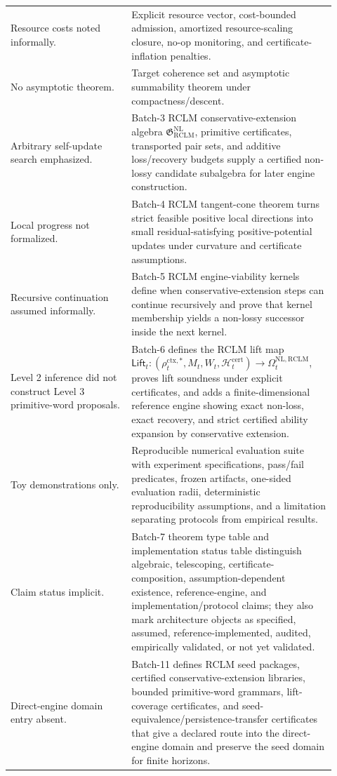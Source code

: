 \documentclass[11pt,a4paper]{article}
\newcommand{\RCLM}{\mathrm{RCLM}}
\newcommand{\ctx}{\mathrm{ctx}}
\newcommand{\cert}{\mathrm{cert}}
\newcommand{\NL}{\mathrm{NL}}
\begin{document}
\begin{longtable}{p{0.34\linewidth}p{0.58\linewidth}}
Resource costs noted informally. & Explicit resource vector, cost-bounded admission, amortized resource-scaling closure, no-op monitoring, and certificate-inflation penalties.\\
No asymptotic theorem. & Target coherence set and asymptotic summability theorem under compactness/descent.\\
Arbitrary self-update search emphasized. & Batch-3 RCLM conservative-extension algebra \(\mathfrak G_{\RCLM}^{\NL}\), primitive certificates, transported pair sets, and additive loss/recovery budgets supply a certified non-lossy candidate subalgebra for later engine construction.\\
Local progress not formalized. & Batch-4 RCLM tangent-cone theorem turns strict feasible positive local directions into small residual-satisfying positive-potential updates under curvature and certificate assumptions.\\
Recursive continuation assumed informally. & Batch-5 RCLM engine-viability kernels define when conservative-extension steps can continue recursively and prove that kernel membership yields a non-lossy successor inside the next kernel.\\
Level 2 inference did not construct Level 3 primitive-word proposals. & Batch-6 defines the RCLM lift map \(\mathsf{Lift}_t:(\rho_t^{\ctx,*},M_t,W_t,\mathcal H_t^{\cert})\to\Omega_t^{\NL,\RCLM}\), proves lift soundness under explicit certificates, and adds a finite-dimensional reference engine showing exact non-loss, exact recovery, and strict certified ability expansion by conservative extension.\\
Toy demonstrations only. & Reproducible numerical evaluation suite with experiment specifications, pass/fail predicates, frozen artifacts, one-sided evaluation radii, deterministic reproducibility assumptions, and a limitation separating protocols from empirical results.\\
Claim status implicit. & Batch-7 theorem type table and implementation status table distinguish algebraic, telescoping, certificate-composition, assumption-dependent existence, reference-engine, and implementation/protocol claims; they also mark architecture objects as specified, assumed, reference-implemented, audited, empirically validated, or not yet validated.\\
Direct-engine domain entry absent. & Batch-11 defines RCLM seed packages, certified conservative-extension libraries, bounded primitive-word grammars, lift-coverage certificates, and seed-equivalence/persistence-transfer certificates that give a declared route into the direct-engine domain and preserve the seed domain for finite horizons.\\

\end{longtable}
\end{document}
